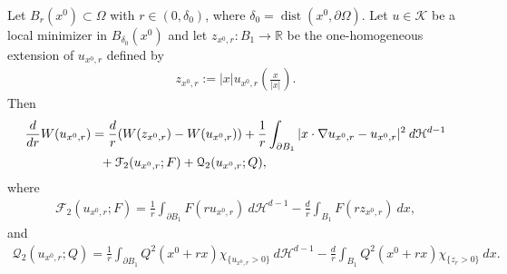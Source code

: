 \documentclass[11pt,reqno]{amsart}
\begin{document}
\begin{proposition}\label{Proposition: second monotonicity formula}
	Let $B_{r}(x^{0})\subset\Omega$ with $r\in(0,\delta_{0})$, where $\delta_{0}=\operatorname{dist}(x^{0},\partial\Omega)$. Let $u\in\mathcal{K}$ be a local minimizer in $B_{\delta_{0}}(x^{0})$ and let $z_{x^{0},r}\colon B_{1}\to\mathbb{R}$ be the one-homogeneous extension of $u_{x^{0},r}$ defined by
	\begin{align}\label{Formula: M(21)}
		z_{x^{0},r}:=|x|u_{x^{0},r}\left(\frac{x}{|x|}\right).
	\end{align}
    Then
    \begin{align}\label{Formula: M(22)}
    	\begin{alignedat}{2}
    		\frac{d}{dr}W(u_{x^{0},r})&=\frac{d}{r}(W(z_{x^{0},r})-W(u_{x^{0},r}))+\frac{1}{r}\int_{\partial B_{1}}|x\cdot\nabla u_{x^{0},r}-u_{x^{0},r}|^{2}\:d\mathcal{H}^{d-1}\\
    		&\ \ +\mathcal{F}_{2}(u_{x^{0},r};F)+\cQ_{2}(u_{x^{0},r};Q),
    	\end{alignedat}
    \end{align}
    where
    \begin{align}\label{Formula: M(23)}
    	\mathcal{F}_{2}(u_{x^{0},r};F)=\frac{1}{r}\int_{\partial B_{1}}F(ru_{x^{0},r})\:d\mathcal{H}^{d-1}-\frac{d}{r}\int_{B_{1}}F(rz_{x^{0},r})\:dx,
    \end{align}
    and
    \begin{align}\label{Formula: M(24)}
    	\mathcal{Q}_{2}(u_{x^{0},r};Q)=\frac{1}{r}\int_{\partial B_{1}}Q^{2}(x^{0}+rx)\chi_{\{ u_{x^{0},r}>0\}}\:d\mathcal{H}^{d-1}-\frac{d}{r}\int_{B_{1}}Q^{2}(x^{0}+rx)\chi_{\{ z_{r}>0\}}\:dx.
    \end{align}
\end{proposition}
\end{document}
